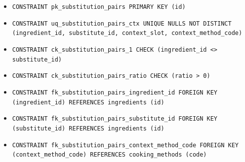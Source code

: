 \begin{itemize}
\item \raggedright {\small\texttt{CONSTRAINT pk\_\allowbreak{}\allowbreak{}substitution\_\allowbreak{}\allowbreak{}pairs PRIMARY KEY (id)}}
\item \raggedright {\small\texttt{CONSTRAINT uq\_\allowbreak{}\allowbreak{}substitution\_\allowbreak{}\allowbreak{}pairs\_\allowbreak{}\allowbreak{}ctx UNIQUE NULLS NOT DISTINCT (ingredient\_\allowbreak{}\allowbreak{}id, substitute\_\allowbreak{}\allowbreak{}id, context\_\allowbreak{}\allowbreak{}slot, context\_\allowbreak{}\allowbreak{}method\_\allowbreak{}\allowbreak{}code)}}
\item \raggedright {\small\texttt{CONSTRAINT ck\_\allowbreak{}\allowbreak{}substitution\_\allowbreak{}\allowbreak{}pairs\_\allowbreak{}\allowbreak{}1 CHECK (ingredient\_\allowbreak{}\allowbreak{}id <> substitute\_\allowbreak{}\allowbreak{}id)}}
\item \raggedright {\small\texttt{CONSTRAINT ck\_\allowbreak{}\allowbreak{}substitution\_\allowbreak{}\allowbreak{}pairs\_\allowbreak{}\allowbreak{}ratio CHECK (ratio > 0)}}
\item \raggedright {\small\texttt{CONSTRAINT fk\_\allowbreak{}\allowbreak{}substitution\_\allowbreak{}\allowbreak{}pairs\_\allowbreak{}\allowbreak{}ingredient\_\allowbreak{}\allowbreak{}id FOREIGN KEY (ingredient\_\allowbreak{}\allowbreak{}id) REFERENCES ingredients (id)}}
\item \raggedright {\small\texttt{CONSTRAINT fk\_\allowbreak{}\allowbreak{}substitution\_\allowbreak{}\allowbreak{}pairs\_\allowbreak{}\allowbreak{}substitute\_\allowbreak{}\allowbreak{}id FOREIGN KEY (substitute\_\allowbreak{}\allowbreak{}id) REFERENCES ingredients (id)}}
\item \raggedright {\small\texttt{CONSTRAINT fk\_\allowbreak{}\allowbreak{}substitution\_\allowbreak{}\allowbreak{}pairs\_\allowbreak{}\allowbreak{}context\_\allowbreak{}\allowbreak{}method\_\allowbreak{}\allowbreak{}code FOREIGN KEY (context\_\allowbreak{}\allowbreak{}method\_\allowbreak{}\allowbreak{}code) REFERENCES cooking\_\allowbreak{}\allowbreak{}methods (code)}}
\end{itemize}
